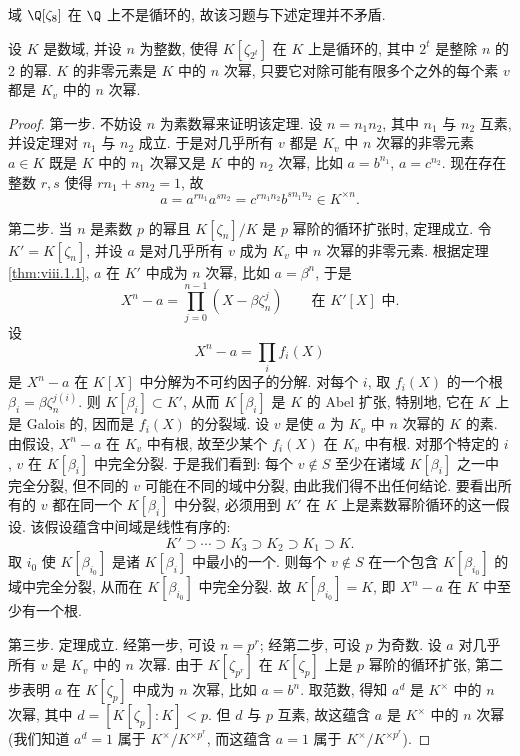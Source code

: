 域 $\Q[\zeta_8]$ 在 $\Q$ 上不是循环的, 故该习题与下述定理并不矛盾.

\begin{theorem}\label{thm:viii.1.4}
设 $K$ 是数域, 并设 $n$ 为整数, 使得 $K[\zeta_{2^{t}}]$ 在 $K$ 上是循环的, 其中 $2^{t}$ 是整除 $n$ 的 2 的幂. $K$ 的非零元素是 $K$ 中的 $n$ 次幂, 只要它对除可能有限多个之外的每个素 $v$ 都是 $K_v$ 中的 $n$ 次幂.
\end{theorem}

\begin{proof}
第一步. 不妨设 $n$ 为素数幂来证明该定理. 设 $n=n_1n_2$, 其中 $n_1$ 与 $n_2$ 互素, 并设定理对 $n_1$ 与 $n_2$ 成立. 于是对几乎所有 $v$ 都是 $K_v$ 中 $n$ 次幂的非零元素 $a\in K$ 既是 $K$ 中的 $n_1$ 次幂又是 $K$ 中的 $n_2$ 次幂, 比如 $a=b^{n_1}$, $a=c^{n_2}$. 现在存在整数 $r,s$ 使得 $rn_1+sn_2=1$, 故
\[
a=a^{rn_1}a^{sn_2}=c^{rn_1n_2}b^{sn_1n_2}\in K^{\times n}.
\]

第二步. 当 $n$ 是素数 $p$ 的幂且 $K[\zeta_n]/K$ 是 $p$ 幂阶的循环扩张时, 定理成立. 令 $K'=K[\zeta_n]$, 并设 $a$ 是对几乎所有 $v$ 成为 $K_v$ 中 $n$ 次幂的非零元素. 根据定理\ref{thm:viii.1.1}, $a$ 在 $K'$ 中成为 $n$ 次幂, 比如 $a=\beta^{n}$, 于是
\[
X^{n}-a=\prod_{j=0}^{n-1}(X-\beta\zeta_n^{j})\qquad\text{在 } K'[X] \text{ 中}.
\]
设
\[
X^{n}-a=\prod_{i}f_{i}(X)
\]
是 $X^{n}-a$ 在 $K[X]$ 中分解为不可约因子的分解. 对每个 $i$, 取 $f_i(X)$ 的一个根 $\beta_i=\beta\zeta_n^{j(i)}$. 则 $K[\beta_i]\subset K'$, 从而 $K[\beta_i]$ 是 $K$ 的 Abel 扩张, 特别地, 它在 $K$ 上是 Galois 的, 因而是 $f_i(X)$ 的分裂域. 设 $v$ 是使 $a$ 为 $K_v$ 中 $n$ 次幂的 $K$ 的素. 由假设, $X^{n}-a$ 在 $K_v$ 中有根, 故至少某个 $f_i(X)$ 在 $K_v$ 中有根. 对那个特定的 $i$, $v$ 在 $K[\beta_i]$ 中完全分裂. 于是我们看到: 每个 $v\notin S$ 至少在诸域 $K[\beta_i]$ 之一中完全分裂, 但不同的 $v$ 可能在不同的域中分裂, 由此我们得不出任何结论. 要看出所有的 $v$ 都在同一个 $K[\beta_i]$ 中分裂, 必须用到 $K'$ 在 $K$ 上是素数幂阶循环的这一假设. 该假设蕴含中间域是线性有序的:
\[
K'\supset\cdots\supset K_{3}\supset K_{2}\supset K_{1}\supset K.
\]
取 $i_0$ 使 $K[\beta_{i_0}]$ 是诸 $K[\beta_i]$ 中最小的一个. 则每个 $v\notin S$ 在一个包含 $K[\beta_{i_0}]$ 的域中完全分裂, 从而在 $K[\beta_{i_0}]$ 中完全分裂. 故 $K[\beta_{i_0}]=K$, 即 $X^{n}-a$ 在 $K$ 中至少有一个根.

第三步. 定理成立. 经第一步, 可设 $n=p^{r}$; 经第二步, 可设 $p$ 为奇数. 设 $a$ 对几乎所有 $v$ 是 $K_v$ 中的 $n$ 次幂. 由于 $K[\zeta_{p^r}]$ 在 $K[\zeta_p]$ 上是 $p$ 幂阶的循环扩张, 第二步表明 $a$ 在 $K[\zeta_p]$ 中成为 $n$ 次幂, 比如 $a=b^{n}$. 取范数, 得知 $a^{d}$ 是 $K^{\times}$ 中的 $n$ 次幂, 其中 $d=[K[\zeta_p]:K]<p$. 但 $d$ 与 $p$ 互素, 故这蕴含 $a$ 是 $K^{\times}$ 中的 $n$ 次幂 (我们知道 $a^{d}=1$ 属于 $K^{\times}/K^{\times p^{r}}$, 而这蕴含 $a=1$ 属于 $K^{\times}/K^{\times p^{r}}$).
\end{proof}


